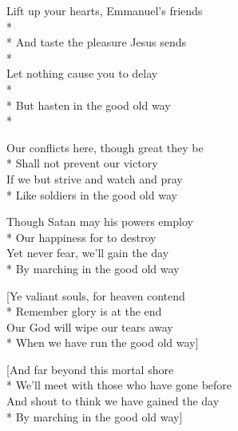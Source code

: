 

\versemark
Lift up your hearts, Emmanuel’s friends\\*
\vin{}\\*
And taste the pleasure Jesus sends\\*
\vin{}\\
Let nothing cause you to delay\\*
\vin{}\\*
But hasten in the good old way\\*
\vin{}

\versemark
Our conflicts here, though great they be\etc\\*
Shall not prevent our victory\etc\\
If we but strive and watch and pray\etc\\*
Like soldiers in the good old way\etc

\versemark
Though Satan may his powers employ\etc\\*
Our happiness for to destroy\etc\\
Yet never fear, we’ll gain the day\etc\\*
By marching in the good old way\etc

[Ye valiant souls, for heaven contend\etc\\*
Remember glory is at the end\etc\\
Our God will wipe our tears away\etc\\*
When we have run the good old way\etc]

[And far beyond this mortal shore\etc\\*
We’ll meet with those who have gone before\etc\\
And shout to think we have gained the day\etc\\*
By marching in the good old way\etc]

